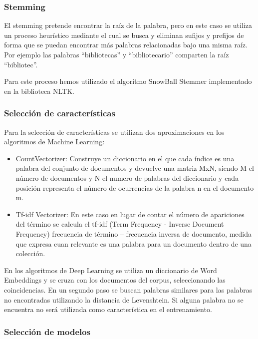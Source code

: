 \subsubsection{Stemming}

El stemming pretende encontrar la raíz de la palabra, pero en este caso se utiliza un proceso heurístico mediante el cual se busca y eliminan sufijos y prefijos de forma que se puedan encontrar más palabras relacionadas bajo una misma raíz. Por ejemplo las palabras ``bibliotecas'' y ``bibliotecario'' comparten la raíz ``bibliotec''.

Para este proceso hemos utilizado el algoritmo SnowBall Stemmer implementado en la biblioteca NLTK.

\subsubsection{Selección de características}\label{tfidf}

Para la selección de características se utilizan dos aproximaciones en los algoritmos de Machine Learning:

\begin{itemize}
\item CountVectorizer: Construye un diccionario en el que cada índice es una palabra del conjunto de documentos y devuelve una matriz MxN, siendo M el número de documentos y N el numero de palabras del diccionario y cada posición representa el número de ocurrencias de la palabra n en el documento m.
\item Tf-idf Vectorizer: En este caso en lugar de contar el número de apariciones del término se calcula el tf-idf (Term Frequency - Inverse Document Frequency) frecuencia de término – frecuencia inversa de documento, medida que expresa cuan relevante es una palabra para un documento dentro de una colección.
\end{itemize}

En los algoritmos de Deep Learning se utiliza un diccionario de Word Embeddings y se cruza con los documentos del corpus, seleccionando las coincidencias. En un segundo paso se buscan palabras similares para las palabras no encontradas utilizando la distancia de Levenshtein. Si alguna palabra no se encuentra no será utilizada como característica en el entrenamiento.

\subsubsection{Selección de modelos}


